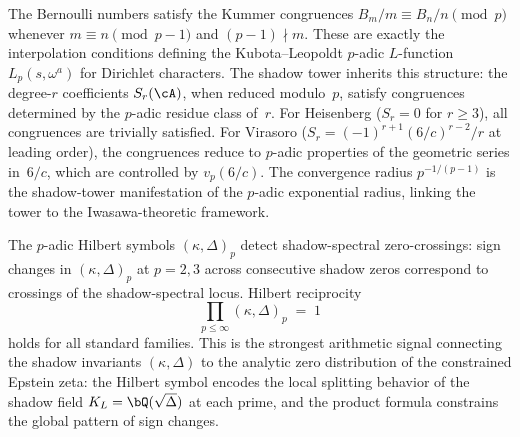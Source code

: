 \begin{remark}%
\label{rem:kummer-kubota-leopoldt}%
\ClaimStatusProvedHere%
%
The Bernoulli numbers satisfy the Kummer congruences
$B_m/m \equiv B_n/n \pmod{p}$ whenever
$m \equiv n \pmod{p{-}1}$ and $(p{-}1) \nmid m$.
These are exactly the interpolation conditions defining
the Kubota--Leopoldt $p$-adic $L$-function
$L_p(s, \omega^a)$ for Dirichlet characters.
The shadow tower inherits this structure: the degree-$r$
coefficients $S_r(\cA)$, when reduced modulo~$p$,
satisfy congruences determined by the $p$-adic residue
class of~$r$. For Heisenberg ($S_r = 0$ for $r \geq 3$),
all congruences are trivially satisfied. For Virasoro
($S_r = (-1)^{r+1}(6/c)^{r-2}/r$ at leading order), the
congruences reduce to $p$-adic properties of the geometric
series in~$6/c$, which are controlled by $v_p(6/c)$.
The convergence radius $p^{-1/(p-1)}$ is the shadow-tower
manifestation of the $p$-adic exponential radius, linking
the tower to the Iwasawa-theoretic framework.
\end{remark}

\begin{remark}
\label{rem:hilbert-symbol-detection}
The $p$-adic Hilbert symbols $(\kappa, \Delta)_p$ detect
shadow-spectral zero-crossings: sign changes in
$(\kappa, \Delta)_p$ at $p = 2, 3$ across consecutive
shadow zeros correspond to crossings of the shadow-spectral
locus. Hilbert reciprocity
\begin{equation}\label{eq:hilbert-reciprocity-shadow}
 \prod_{p \le \infty} (\kappa, \Delta)_p \;=\; 1
\end{equation}
holds for all standard families. This is the
strongest arithmetic signal connecting the shadow
invariants $(\kappa, \Delta)$ to the analytic
zero distribution of the constrained Epstein zeta:
the Hilbert symbol encodes the local splitting behavior
of the shadow field $K_L = \bQ(\sqrt{\Delta})$
at each prime, and the product formula constrains
the global pattern of sign changes.
\end{remark}


